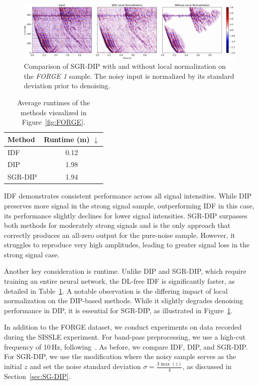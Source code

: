 \begin{figure}
    \centering
    \includegraphics[width=\textwidth]{img/fig_6.5.png}
    \caption{
        Comparison of SGR-DIP with and without local normalization on the \textit{FORGE 1} sample.
        The noisy input is normalized by its standard deviation prior to denoising.
    }\label{fig:local-normalization}
\end{figure}

\begin{table}
    \centering
    \begin{tabular}{ l c }
        \toprule
        Method &Runtime (m) $\downarrow$\\
        \midrule
        IDF &0.12\\
        DIP &1.98\\
        SGR-DIP &1.94\\
        \bottomrule
    \end{tabular}
    \caption{Average runtimes of the methods visualized in Figure~\ref{fig:FORGE}.}\label{tab:runtimes}
\end{table}

IDF demonstrates consistent performance across all signal intensities.
While DIP preserves more signal in the strong signal sample, outperforming IDF in this case, its performance slightly declines for lower signal intensities.
SGR-DIP surpasses both methods for moderately strong signals and is the only approach that correctly produces an all-zero output for the pure-noise sample.
However, it struggles to reproduce very high amplitudes, leading to greater signal loss in the strong signal case.

Another key consideration is runtime.
Unlike DIP and SGR-DIP, which require training an entire neural network, the DL-free IDF is significantly faster, as detailed in Table~\ref{tab:runtimes}.
A notable observation is the differing impact of local normalization on the DIP-based methods. 
While it slightly degrades denoising performance in DIP, it is essential for SGR-DIP, as illustrated in Figure~\ref{fig:local-normalization}.

In addition to the FORGE dataset, we conduct experiments on data recorded during the SISSLE experiment.
For band-pass preprocessing, we use a high-cut frequency of 10\,Hz, following~\cite{DAS-CN2S}.
As before, we compare IDF, DIP, and SGR-DIP\@.
For SGR-DIP, we use the modification where the noisy sample serves as the initial $z$ and set the noise standard deviation $\sigma = \frac{3\max(z)}{4}$, as discussed in Section~\ref{sec:SG-DIP}.

